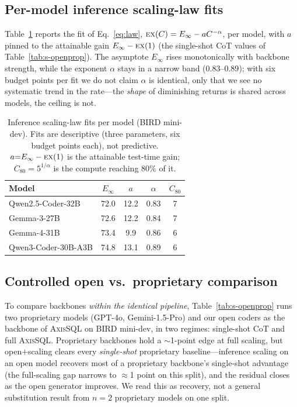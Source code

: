 \documentclass{article}
\newcommand{\sys}{\textsc{AxisSQL}\xspace}
\newcommand{\ex}{\textsc{ex}\xspace}
\begin{document}
\subsection{Per-model inference scaling-law fits}
\label{app:law}
Table~\ref{tab:s-law} reports the fit of Eq.~\ref{eq:law}, $\ex(C)=E_\infty-aC^{-\alpha}$, per model, with $a$ pinned to the attainable gain $E_\infty-\ex(1)$ (the single-shot CoT values of Table~\ref{tab:s-openprop}). The asymptote $E_\infty$ rises monotonically with backbone strength, while the exponent $\alpha$ stays in a narrow band ($0.83$--$0.89$); with six budget points per fit we do not claim $\alpha$ is identical, only that we see no systematic trend in the rate---the \emph{shape} of diminishing returns is shared across models, the ceiling is not.

\begin{table}[h]
\centering\small
\caption{Inference scaling-law fits per model (BIRD mini-dev). Fits are descriptive (three parameters, six budget points each), not predictive. $a{=}E_\infty-\ex(1)$ is the attainable test-time gain; $C_{80}{=}5^{1/\alpha}$ is the compute reaching $80\%$ of it.}
\label{tab:s-law}
\begin{tabular}{@{}lcccc@{}}
\toprule
\textbf{Model} & $E_\infty$ & $a$ & $\alpha$ & $C_{80}$ \\
\midrule
Qwen2.5-Coder-32B    & 72.0 & 12.2 & 0.83 & 7 \\
Gemma-3-27B          & 72.6 & 12.2 & 0.84 & 7 \\
Gemma-4-31B          & 73.4 & 9.9  & 0.86 & 6 \\
Qwen3-Coder-30B-A3B  & 74.8 & 13.1 & 0.89 & 6 \\
\bottomrule
\end{tabular}
\end{table}

\subsection{Controlled open vs.\ proprietary comparison}
\label{app:openprop}
To compare backbones \emph{within the identical pipeline}, Table~\ref{tab:s-openprop} runs two proprietary models (GPT-4o, Gemini-1.5-Pro) and our open coders as the backbone of \sys{} on BIRD mini-dev, in two regimes: single-shot CoT and full \sys. Proprietary backbones hold a $\sim$1-point edge at full scaling, but open$+$scaling clears every \emph{single-shot} proprietary baseline---inference scaling on an open model recovers most of a proprietary backbone's single-shot advantage (the full-scaling gap narrows to $\approx$1 point on this split), and the residual closes as the open generator improves. We read this as recovery, not a general substitution result from $n{=}2$ proprietary models on one split.
\end{document}
